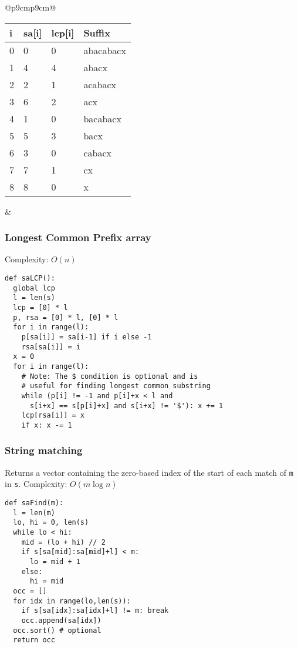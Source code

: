\documentclass[letterpaper]{article}
\begin{document}
\begin{tabular}{@{}p{9cm}p{9cm}@{}}
    {
        \fontfamily{\ttdefault}\selectfont
        \begin{tabular}{llll}
            i & sa[i] & lcp[i] & Suffix    \\ \hline
            0 & 0     & 0      & abacabacx \\
            1 & 4     & 4      & abacx     \\
            2 & 2     & 1      & acabacx   \\
            3 & 6     & 2      & acx       \\
            4 & 1     & 0      & bacabacx  \\
            5 & 5     & 3      & bacx      \\
            6 & 3     & 0      & cabacx    \\
            7 & 7     & 1      & cx        \\
            8 & 8     & 0      & x         \\
        \end{tabular}
    }
     &
    \subsubsection{Longest Common Prefix array}

    Complexity: $O\left(n\right)$

    \begin{lstlisting}
def saLCP():
  global lcp
  l = len(s)
  lcp = [0] * l
  p, rsa = [0] * l, [0] * l
  for i in range(l):
    p[sa[i]] = sa[i-1] if i else -1
    rsa[sa[i]] = i
  x = 0
  for i in range(l):
    # Note: The $ condition is optional and is
    # useful for finding longest common substring
    while (p[i] != -1 and p[i]+x < l and
      s[i+x] == s[p[i]+x] and s[i+x] != '$'): x += 1
    lcp[rsa[i]] = x
    if x: x -= 1
\end{lstlisting}

    \subsubsection{String matching}

    Returns a vector containing the zero-based index of the start of each match of \texttt{m} in \texttt{s}. Complexity: $O\left(m\log n\right)$

    \begin{lstlisting}
def saFind(m):
  l = len(m)
  lo, hi = 0, len(s)
  while lo < hi:
    mid = (lo + hi) // 2
    if s[sa[mid]:sa[mid]+l] < m:
      lo = mid + 1
    else:
      hi = mid
  occ = []
  for idx in range(lo,len(s)):
    if s[sa[idx]:sa[idx]+l] != m: break
    occ.append(sa[idx])
  occ.sort() # optional
  return occ
\end{lstlisting}

\end{tabular}
\end{document}
